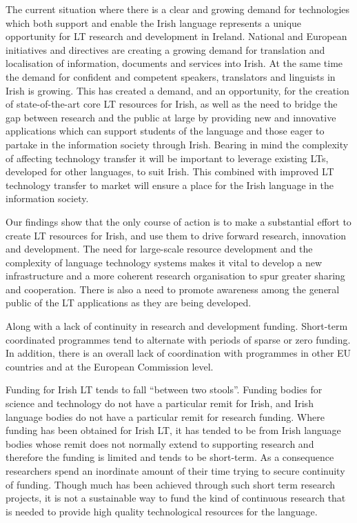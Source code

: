 \begin{multicols}{2}
The current situation where there is a clear and growing demand for technologies which both support and enable the Irish language represents a unique opportunity for LT research and development in Ireland. National and European initiatives and directives are creating a growing demand for translation and localisation of information, documents and services into Irish. At the same time the demand for confident and competent speakers, translators and linguists in Irish is growing. This has created a demand, and an opportunity, for the creation of state-of-the-art core LT resources for Irish, as well as the need to bridge the gap between research and the public at large by providing new and innovative applications which can support students of the language and those eager to partake in the information society through Irish. Bearing in mind the complexity of affecting technology transfer it will be important to leverage existing LTs, developed for other languages, to suit Irish. This combined with improved LT technology transfer to market will ensure a place for the Irish language in the information society.

Our findings show that the only course of action is to make a substantial effort to create LT resources for Irish, and use them to drive forward research, innovation and development. The need for large-scale resource development and the complexity of language technology systems makes it vital to develop a new infrastructure and a more coherent research organisation to spur greater sharing and cooperation. There is also a need to promote awareness among the general public of the LT applications as they are being developed.

Along with a lack of continuity in research and development funding. Short-term coordinated programmes tend to alternate with periods of sparse or zero funding. In addition, there is an overall lack of coordination with programmes in other EU countries and at the European Commission level.

Funding for Irish LT tends to fall ``between two stools''. Funding bodies for science and technology do not have a particular remit for Irish, and Irish language bodies do not have a particular remit for research funding. Where funding has been obtained for Irish LT, it has tended to be from Irish language bodies whose remit does not normally extend to supporting research and therefore the funding is limited and tends to be short-term. As a consequence researchers spend an inordinate amount of their time trying to secure continuity of funding. Though much has been achieved through such short term research projects, it is not a sustainable way to fund the kind of continuous research that is needed to provide high quality technological resources for the language. 


\end{multicols}
